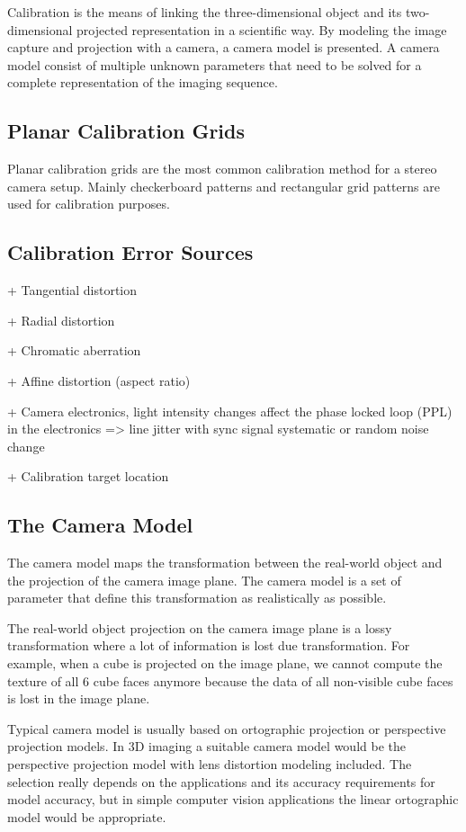 \documentclass[12pt,a4paper,oneside,pdftex]{report}
\begin{document}
Calibration is the means of linking the three-dimensional object and its two-dimensional projected representation in a scientific way. By modeling the image capture and projection with a camera, a camera model is presented. A camera model consist of multiple unknown parameters that need to be solved for a complete representation of the imaging sequence.


\subsection{Planar Calibration Grids}
Planar calibration grids are the most common calibration method for a stereo camera setup. Mainly checkerboard patterns and rectangular grid patterns are used for calibration purposes.

\subsection{Calibration Error Sources}

+ Tangential distortion

+ Radial distortion

+ Chromatic aberration

+ Affine distortion (aspect ratio)

+ Camera electronics, light intensity changes affect the phase locked loop (PPL) in the electronics => line jitter with sync signal systematic or random noise change

+ Calibration target location
\subsection{The Camera Model}
The camera model maps the transformation between the real-world object and the projection of the camera image plane. The camera model is a set of parameter that define this transformation as realistically as possible. 

The real-world object projection on the camera image plane is a lossy transformation where a lot of information is lost due transformation. For example, when a cube is projected on the image plane, we cannot compute the texture of all 6 cube faces anymore because the data of all non-visible cube faces is lost in the image plane.

Typical camera model is usually based on ortographic projection or perspective projection models. In 3D imaging a suitable camera model would be the perspective projection model with lens distortion modeling included. The selection really depends on the applications and its accuracy requirements for model accuracy, but in simple computer vision applications the linear ortographic model would be appropriate. 
\end{document}
